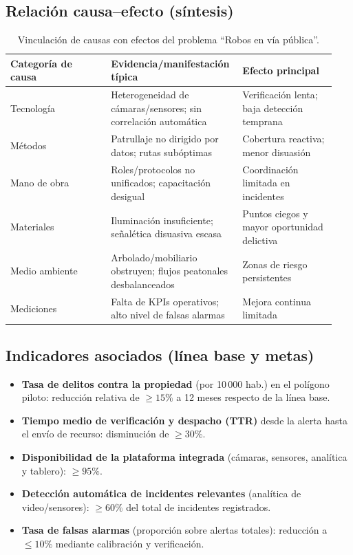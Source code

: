 \documentclass[12pt,a4paper]{article}
\begin{document}
\subsection*{Relación causa–efecto (síntesis)}
\begin{table}[htbp]
\centering
\caption{Vinculación de causas con efectos del problema “Robos en vía pública”.}
\begin{tabular}{p{0.30\linewidth} p{0.36\linewidth} p{0.28\linewidth}}
\hline
\textbf{Categoría de causa} & \textbf{Evidencia/manifestación típica} & \textbf{Efecto principal} \\
\hline
Tecnología & Heterogeneidad de cámaras/sensores; sin correlación automática & Verificación lenta; baja detección temprana \\
Métodos & Patrullaje no dirigido por datos; rutas subóptimas & Cobertura reactiva; menor disuasión \\
Mano de obra & Roles/protocolos no unificados; capacitación desigual & Coordinación limitada en incidentes \\
Materiales & Iluminación insuficiente; señalética disuasiva escasa & Puntos ciegos y mayor oportunidad delictiva \\
Medio ambiente & Arbolado/mobiliario obstruyen; flujos peatonales desbalanceados & Zonas de riesgo persistentes \\
Mediciones & Falta de KPIs operativos; alto nivel de falsas alarmas & Mejora continua limitada \\
\hline
\end{tabular}
\end{table}

\subsection*{Indicadores asociados (línea base y metas)}
\begin{itemize}
    \item \textbf{Tasa de delitos contra la propiedad} (por 10\,000 hab.) en el polígono piloto: reducción relativa de \(\geq 15\%\) a 12 meses respecto de la línea base.
    \item \textbf{Tiempo medio de verificación y despacho (TTR)} desde la alerta hasta el envío de recurso: disminución de \(\geq 30\%\).
    \item \textbf{Disponibilidad de la plataforma integrada} (cámaras, sensores, analítica y tablero): \(\geq 95\%\).
    \item \textbf{Detección automática de incidentes relevantes} (analítica de video/sensores): \(\geq 60\%\) del total de incidentes registrados.
    \item \textbf{Tasa de falsas alarmas} (proporción sobre alertas totales): reducción a \(\leq 10\%\) mediante calibración y verificación.
\end{itemize}
\end{document}
